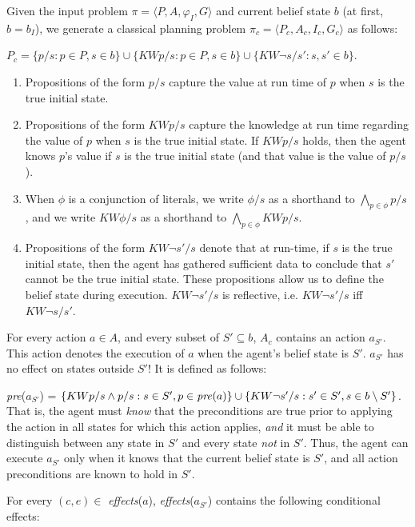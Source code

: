 \documentclass[letterpaper]{article}
\numberwithin{equation}{section}	%
\begin{document}
Given the input problem $\pi=\langle P,A,\varphi_I,G\rangle$ and current belief state $b$ (at first, $b=b_I$), we generate a classical planning problem
$\pi_c = \langle P_c,A_c, I_c, G_c\rangle$ as follows:
\begin{description}
\item [Propositions] $P_c = \{p/s : p\in P , s\in b\}\cup \{KWp/s : p\in P , s\in b\}\cup\{KW\neg s/s' : s,s'\in b\}.$
\begin{enumerate}{\leftmargin=0em \itemindent=0em}
\item Propositions of the form $p/s$ capture the value at run time of $p$ when $s$ is the true initial state.
\item Propositions of the form $KWp/s$ capture the knowledge at run time regarding the value of $p$ when $s$ is
the true initial state. If $KWp/s$ holds, then the agent knows $p$'s value if $s$ is the true initial state (and
that value is the value of $p/s$).
\item When $\phi$ is a conjunction of literals, we write $\phi/s$ as a shorthand to $\bigwedge_{p \in \phi}p/s$, and we write $KW\phi/s$ as a shorthand to $\bigwedge_{p \in \phi}KWp/s$.
\item Propositions of the form $KW\neg s'/s$ denote that at run-time, if $s$ is the true
initial state, then the agent has gathered sufficient data to conclude that $s'$ cannot be the true initial state. These propositions allow us to define the belief state during execution. $KW\neg s'/s$ is reflective, i.e. $KW\neg s'/s$ iff $KW\neg s/s'$.
\end{enumerate}
\item [Actions] For every action $a\in A$, and every subset of $S'\subseteq b$, $A_c$ contains an action $a_{S'}$. This action
denotes the execution of $a$ when the agent's belief state is $S'$. $a_{S'}$ has no effect on states outside $S'$! It is defined as follows:
\item \emph{pre}($a_{S'}$) =  $\{KWp/s \wedge p/s : s \in S', p\in \mbox{\emph{pre}}(a)\} \cup\{KW\neg s'/s : s' \in S', s \in b\setminus S'\}$. That is, the agent must \emph{know} that the preconditions are true prior to applying the action in all states for which this action applies, {\em and} it must be able to distinguish between any state in $S'$ and every state {\em not} in $S'$. Thus, the agent can execute $a_{S'}$ only when it knows that the current belief state is $S'$, and all action preconditions are known to hold in $S'$.
\item For every $(c,e)\in $ \emph{effects}($a$), \emph{effects}($a_{S'}$) contains the following conditional effects:

\end{description}
\end{document}
